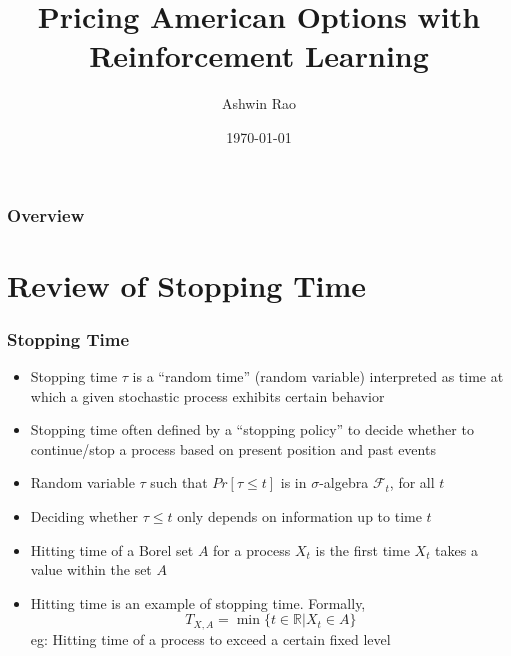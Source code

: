 \documentclass{beamer}
\title[RL for American Options]{Pricing American Options with Reinforcement Learning} %
\author{Ashwin Rao} %
\institute[Stanford] %
{
ICME, Stanford University
}
\date{\today} %
\begin{document}
\begin{frame}
\titlepage %
\end{frame}

\begin{frame}
\frametitle{Overview} %
\tableofcontents %
\end{frame}

\section{Review of Stopping Time}

\begin{frame}
\frametitle{Stopping Time}
\begin{itemize}
\item Stopping time $\tau$ is a ``random time'' (random variable) interpreted as time at which a given stochastic process exhibits certain behavior
\item Stopping time often defined by a ``stopping policy'' to decide whether to continue/stop a process based on present position and past events
\item Random variable $\tau$ such that $Pr[\tau \leq t]$ is in $\sigma$-algebra $\mathcal{F}_t$, for all $t$
\item Deciding whether $\tau \leq t$ only depends on information up to time $t$
\item Hitting time of a Borel set $A$ for a process $X_t$ is the first time $X_t$ takes a value within the set $A$
\item Hitting time is an example of stopping time. Formally, 
$$T_{X,A} = \min \{t \in \mathbb{R} | X_t \in A\}$$
eg: Hitting time of a process to exceed a certain fixed level
\end{itemize}
\end{frame}
\end{document}
